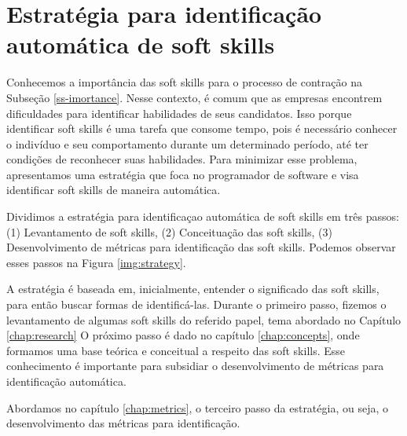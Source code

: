

\chapter{Estratégia para identificação automática de soft skills}

\label{chap:strategy}

Conhecemos a importância das soft skills para o processo de contração na Subseção \ref{ss-imortance}. Nesse contexto, é comum que as empresas encontrem dificuldades para identificar habilidades de seus candidatos. Isso porque identificar soft skills é uma tarefa que consome tempo, pois é necessário conhecer o indivíduo e seu comportamento durante um determinado período, até ter condições de reconhecer suas habilidades. Para minimizar esse problema, apresentamos uma estratégia que foca no programador de software e visa identificar soft skills de maneira automática.

Dividimos a estratégia para identificaçao automática de soft skills em três passos: (1) Levantamento de soft skills, (2) Conceituação das soft skills, (3) Desenvolvimento de métricas para identificação das soft skills. Podemos observar esses passos na Figura \ref{img:strategy}.

A estratégia é baseada em, inicialmente, entender o significado das soft skills, para então buscar formas de identificá-las.
Durante o primeiro passo, fizemos o levantamento de algumas soft skills do referido papel, tema abordado no Capítulo \ref{chap:research}
O próximo passo é dado no capítulo \ref{chap:concepts}, onde formamos uma base teórica e conceitual a respeito das soft skills. Esse conhecimento é importante para subsidiar o desenvolvimento de métricas para identificação automática.

Abordamos no capítulo \ref{chap:metrics}, o terceiro passo da estratégia, ou seja, o desenvolvimento das métricas para identificação. 

